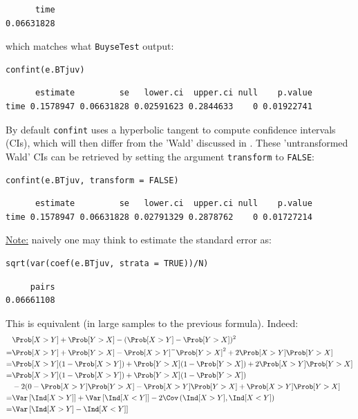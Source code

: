 \documentclass[12pt]{article}
\begin{document}
\begin{verbatim}
      time 
0.06631828
\end{verbatim}


which matches what \texttt{BuyseTest} output:
\lstset{language=r,label= ,caption= ,captionpos=b,numbers=none}
\begin{lstlisting}
confint(e.BTjuv)
\end{lstlisting}

\begin{verbatim}
      estimate         se   lower.ci  upper.ci null    p.value
time 0.1578947 0.06631828 0.02591623 0.2844633    0 0.01922741
\end{verbatim}


By default \texttt{confint} uses a hyperbolic tangent to compute confidence
intervals (CIs), which will then differ from the 'Wald' discussed in
\cite{matsouaka2022robust}. These 'untransformed Wald' CIs can be
retrieved by setting the argument \texttt{transform} to \texttt{FALSE}:
\lstset{language=r,label= ,caption= ,captionpos=b,numbers=none}
\begin{lstlisting}
confint(e.BTjuv, transform = FALSE)
\end{lstlisting}

\begin{verbatim}
      estimate         se   lower.ci  upper.ci null    p.value
time 0.1578947 0.06631828 0.02791329 0.2878762    0 0.01727214
\end{verbatim}


\clearpage

\uline{Note:} naively one may think to estimate the standard error as:
\lstset{language=r,label= ,caption= ,captionpos=b,numbers=none}
\begin{lstlisting}
sqrt(var(coef(e.BTjuv, strata = TRUE))/N)
\end{lstlisting}

\begin{verbatim}
     pairs 
0.06661108
\end{verbatim}


This is equivalent (in large samples to the previous formula). Indeed:
\begin{align*}
&\Prob[X>Y] + \Prob[Y>X] - (\Prob[X>Y] - \Prob[Y>X])^2 \\
=& \Prob[X>Y] + \Prob[Y>X] - \Prob[X>Y]^ - \Prob[Y>X]^2 + 2 \Prob[X>Y] \Prob[Y>X] \\
=& \Prob[X>Y](1-\Prob[X>Y]) + \Prob[Y>X](1-\Prob[Y>X]) + 2 \Prob[X>Y] \Prob[Y>X] \\
=& \Prob[X>Y](1-\Prob[X>Y]) + \Prob[Y>X](1-\Prob[Y>X]) \\
 & - 2 (0 - \Prob[X>Y] \Prob[Y>X] - \Prob[X>Y] \Prob[Y>X] + \Prob[X>Y] \Prob[Y>X] \\
=& \Var\left[\Ind[X>Y]\right] + \Var\left[\Ind[X<Y]\right] - 2 \Cov\left(\Ind[X>Y],\Ind[X<Y]\right) \\
=& \Var\left[\Ind[X>Y]-\Ind[X<Y]\right] \\
\end{align*}
\end{document}

